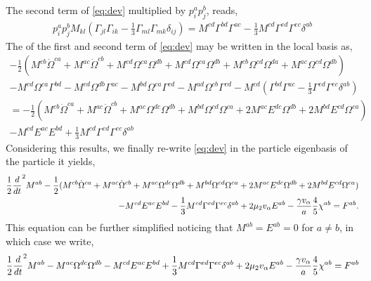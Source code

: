 The second term of \ref{eq:dev} multiplied by $p_i^ap_j^b$, reads, 
\begin{align*}
    p_i^a p_j^b M_{kl}( \Gamma_{jl}\Gamma_{ik} 
    - \frac{1}{3}
    \Gamma_{ml}\Gamma_{mk}  
    \delta_{ij})
    = 
    M^{cd} \Gamma^{bd}\Gamma^{ac} 
    - \frac{1}{3}
    M^{cd}\Gamma^{ed}\Gamma^{ec}  
    \delta^{ab}
\end{align*}
The of the first and second term of \ref{eq:dev} may be written in the local basis as, 
\begin{align*}
    - \frac{1}{2}(
    M^{cb} \dot{\Omega}^{ca}
    + M^{ac} \dot{\Omega}^{cb}
    + M^{cd} \Omega^{ca}\Omega^{db}
    + M^{cd} \Omega^{ca}\Omega^{db}
    + M^{cb} \Omega^{cd}\Omega^{da} 
    + M^{ac} \Omega^{cd}\Omega^{db}
)\\
    - M^{cd}\Omega^{ca} \Gamma^{bd}   
    - M^{cd}\Omega^{db} \Gamma^{ac}   
    - M^{bd}\Omega^{ca} \Gamma^{cd}  
    - M^{ad}\Omega^{cb}  \Gamma^{cd} 
    - M^{cd}( \Gamma^{bd}\Gamma^{ac} 
    - \frac{1}{3}
    \Gamma^{ed}\Gamma^{ec}  
    \delta^{ab})\\
    = 
    -\frac{1}{2}(
    M^{cb} \dot{\Omega}^{ca}
    + M^{ac} \dot{\Omega}^{cb}
    + M^{ac} \Omega^{dc} \Omega^{db}  
    + M^{bd} \Omega^{cd}  \Omega^{ca}
    + 2 M^{ac} E^{dc} \Omega^{db}  
    + 2 M^{bd} E^{cd} \Omega^{ca}
    )\\
    - M^{cd} E^{ac} E^{bd} 
    + \frac{1}{3} M^{cd}
    \Gamma^{ed}\Gamma^{ec}  
    \delta^{ab}
\end{align*}
Considering this results, we finally re-write \ref{eq:dev} in the particle eigenbasis of the particle it yields,
\begin{align*}
    \frac{1}{2}\frac{d}{dt}^2 M^{ab}
    -\frac{1}{2}(
        M^{cb} \dot{\Omega}^{ca}
        + M^{ac} \dot{\Omega}^{cb}
        + M^{ac} \Omega^{dc} \Omega^{db}  
        + M^{bd} \Omega^{cd}  \Omega^{ca}
        + 2 M^{ac} E^{dc} \Omega^{db}  
        + 2 M^{bd} E^{cd} \Omega^{ca}
        )\\
        - M^{cd} E^{ac} E^{bd} 
        - \frac{1}{3} M^{cd}
        \Gamma^{ed}\Gamma^{ec}  
        \delta^{ab}
    + 2 \mu_2 v_\alpha E^{ab}
    - \frac{\gamma v_\alpha }{a} 
    \frac{4  }{5} \chi^{ab}
    = F^{ab}. 
\end{align*}
This equation can be further simplified noticing that $M^{ab} = E^{ab} = 0$ for $a\neq b$, in which case we write,
\begin{align*}
    \frac{1}{2}\frac{d}{dt}^2 M^{ab}
    - M^{ac} \Omega^{dc} \Omega^{db}  
    - M^{cd} E^{ac} E^{bd} 
    + \frac{1}{3} M^{cd}
    \Gamma^{ed}\Gamma^{ec}  
    \delta^{ab}
    + 2 \mu_2 v_\alpha E^{ab}
    - \frac{\gamma v_\alpha }{a} 
    \frac{4  }{5} \chi^{ab}
    = F^{ab}
\end{align*}

